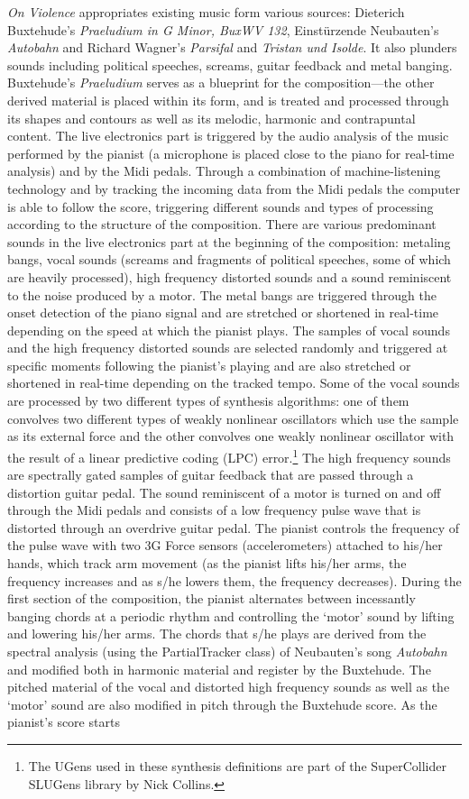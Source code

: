 \emph{On Violence} appropriates existing music form various sources: Dieterich Buxtehude's \emph{Praeludium in G Minor, BuxWV 132}, Einst\"{u}rzende Neubauten's \emph{Autobahn} and Richard Wagner's \emph{Parsifal} and \emph{Tristan und Isolde}. It also plunders sounds including political speeches, screams, guitar feedback and metal banging. Buxtehude's \emph{Praeludium} serves as a blueprint for the composition---the other derived material is placed within its form, and is treated and processed through its shapes and contours as well as its melodic, harmonic and contrapuntal content. The live electronics part is triggered by the audio analysis of the music performed by the pianist (a microphone is placed close to the piano for real-time analysis) and by the Midi pedals. Through a combination of \mbox{machine-listening} technology and by tracking the incoming data from the Midi pedals the computer is able to follow the score, triggering different sounds and types of processing according to the structure of the composition. There are various predominant sounds in the live electronics part at the beginning of the composition: metaling bangs, vocal sounds (screams and fragments of political speeches, some of which are heavily processed), high frequency distorted sounds and a sound reminiscent to the noise produced by a motor. The metal bangs are triggered through the onset detection of the piano signal and are stretched or shortened in real-time depending on the speed at which the pianist plays. The samples of vocal sounds and the high frequency distorted sounds are selected randomly and triggered at specific moments following the pianist's playing and are also stretched or shortened in real-time depending on the tracked tempo. Some of the vocal sounds are processed by two different types of synthesis algorithms: one of them convolves two different types of weakly nonlinear oscillators which use the sample as its external force and the other convolves one weakly nonlinear oscillator with the result of a linear predictive coding (LPC) error.\footnote{The UGens used in these synthesis definitions are part of the SuperCollider SLUGens library by Nick Collins.} The high frequency sounds are spectrally gated samples of guitar feedback that are passed through a distortion guitar pedal. The sound reminiscent of a motor is turned on and off through the Midi pedals and consists of a low frequency pulse wave that is distorted through an overdrive guitar pedal. The pianist controls the frequency of the pulse wave with two 3G Force sensors (accelerometers) attached to his/her hands, which track arm movement (as the pianist lifts his/her arms, the frequency increases and as s/he lowers them, the frequency decreases). During the first section of the composition, the pianist alternates between incessantly banging chords at a periodic rhythm and controlling the `motor' sound by lifting and lowering his/her arms. The chords that s/he plays are derived from the spectral analysis (using the PartialTracker class) of Neubauten's song \emph{Autobahn} and modified both in harmonic material and register by the Buxtehude. The pitched material of the vocal and distorted high frequency sounds as well as the `motor' sound are also modified in pitch through the Buxtehude score. As the pianist's score starts 